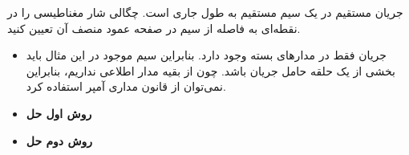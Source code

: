 \begin{ELexample}{}

جریان مستقیم  در یک سیم مستقیم به طول  جاری است. چگالی شار مغناطیسی را در نقطه‌ای به فاصله  از سیم در صفحه عمود منصف آن تعیین کنید.


\begin{ELsolution}

\begin{itemize}
\tightlist
\item
  جریان فقط در مدارهای بسته وجود دارد. بنابراین سیم موجود در این مثال باید بخشی از یک حلقه حامل جریان باشد. چون از بقیه مدار اطلاعی نداریم، بنابراین نمی‌توان از قانون مداری آمپر استفاده کرد.
\item
  \textbf{روش اول حل}
\end{itemize}


\begin{itemize}
\tightlist
\item
  \textbf{روش دوم حل}
\end{itemize}



\end{ELsolution}
\end{ELexample}
